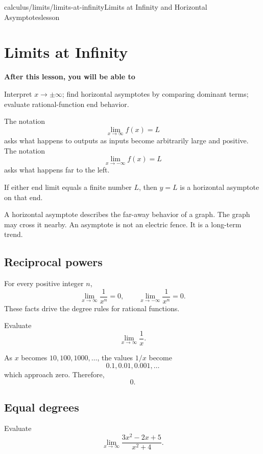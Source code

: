 \documentclass[11pt,openany]{book}
\theoremstyle{bgplain}
\newcounter{bgexample}[chapter]
\newcommand{\lessonobjective}[1]{%
  \par\Needspace{4\baselineskip}\addvspace{0.6em}%
  {\bfseries\color{BGInk}After this lesson, you will be able to}\par\smallskip
  #1\par\addvspace{0.5em}%
}
\begin{document}
\begin{webpage}{calculus/limits/limits-at-infinity}{Limits at Infinity and Horizontal Asymptotes}{lesson}
\section{Limits at Infinity}

\lessonobjective{
Interpret \(x\to\pm\infty\); find horizontal asymptotes by comparing dominant terms; evaluate rational-function end behavior.
}

The notation
\[
  \lim_{x\to\infty}f(x)=L
\]
asks what happens to outputs as inputs become arbitrarily large and positive. The notation
\[
  \lim_{x\to-\infty}f(x)=L
\]
asks what happens far to the left.

If either end limit equals a finite number \(L\), then \(y=L\) is a horizontal asymptote on that end.

\begin{bgconcept}
A horizontal asymptote describes the far-away behavior of a graph. The graph may cross it nearby. An asymptote is not an electric fence. It is a long-term trend.
\end{bgconcept}

\subsection{Reciprocal powers}

For every positive integer \(n\),
\[
  \lim_{x\to\infty}\frac1{x^n}=0,
  \qquad
  \lim_{x\to-\infty}\frac1{x^n}=0.
\]
These facts drive the degree rules for rational functions.

\begin{bgguided}[title={One over a growing number}]
Evaluate
\[
  \lim_{x\to\infty}\frac1x.
\]

\begin{bgsolution}
As \(x\) becomes \(10,100,1000,\ldots\), the values \(1/x\) become
\[
  0.1,0.01,0.001,\ldots
\]
which approach zero. Therefore,
\[
  \boxed{0}.
\]
\end{bgsolution}
\end{bgguided}

\subsection{Equal degrees}

\begin{bgexample}[title={Divide by the largest denominator power}]
Evaluate
\[
  \lim_{x\to\infty}\frac{3x^2-2x+5}{x^2+4}.
\]


\end{bgexample}
\end{webpage}
\end{document}
